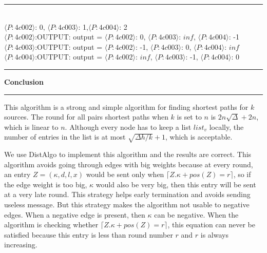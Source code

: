 \documentclass[11pt]{article}  %
\begin{document}
\noindent
\rule{5in}{.1pt}
\noindent \\
{$\langle P:4c002\rangle $: 0, $\langle P:4c003\rangle$: 1,$\langle P:4c004\rangle$: 2}\\
$\langle P:4c002\rangle$:OUTPUT: output = {$\langle P:4c002\rangle$: 0, $\langle P:4c003\rangle$: $inf$, $\langle P:4c004\rangle$: -1}\\
$\langle P:4c003\rangle$:OUTPUT: output = {$\langle P:4c002\rangle$: -1, $\langle P:4c003\rangle$: 0, $\langle P:4c004\rangle$: $inf$}\\
$\langle P:4c004\rangle$:OUTPUT: output = {$\langle P:4c002\rangle$: $inf$, $\langle P:4c003\rangle$: -1, $\langle P:4c004\rangle$: 0}\\
\rule{5in}{.1pt}\par


{\bf Conclusion}

\rule{6in}{.1pt}       %

This algorithm is a strong and simple algorithm for finding shortest paths for $k$ sources. The round for all pairs shortest paths when $k$ is set to $n$ is $2n\sqrt{\Delta} +2n$, which is linear to $n$. Although every node has to keep a list $list_v$ locally, the number of entries in the list is at most $\sqrt{\Delta h/k}+1$, which is acceptable. 

We use DistAlgo to implement this algorithm and the results are correct. This algorithm avoids going through edges with big weights because at every round, an entry $Z=(\kappa, d, l, x)$ would be sent only when $\lceil Z.\kappa + pos(Z) = r \rceil $, so if the edge weight is too big, $\kappa$ would also be very big, then this entry will be sent at a very late round. This strategy helps early termination and avoids sending useless message. But this strategy makes the algorithm not usable to negative edges. When a negative edge is present, then $\kappa$ can be negative. When the algorithm is checking whether $\lceil Z.\kappa + pos(Z) = r \rceil $, this equation can never be satisfied because this entry is less than round number $r$ and $r$ is always increasing.
\end{document}
